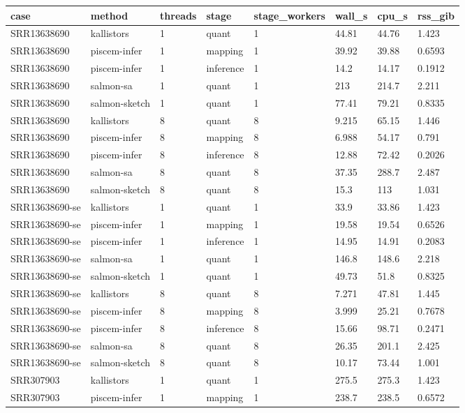 \begin{tabular}{llllllll}
\toprule
case & method & threads & stage & stage\_workers & wall\_s & cpu\_s & rss\_gib \\
\midrule
SRR13638690 & kallistors & 1 & quant & 1 & 44.81 & 44.76 & 1.423 \\
SRR13638690 & piscem-infer & 1 & mapping & 1 & 39.92 & 39.88 & 0.6593 \\
SRR13638690 & piscem-infer & 1 & inference & 1 & 14.2 & 14.17 & 0.1912 \\
SRR13638690 & salmon-sa & 1 & quant & 1 & 213 & 214.7 & 2.211 \\
SRR13638690 & salmon-sketch & 1 & quant & 1 & 77.41 & 79.21 & 0.8335 \\
SRR13638690 & kallistors & 8 & quant & 8 & 9.215 & 65.15 & 1.446 \\
SRR13638690 & piscem-infer & 8 & mapping & 8 & 6.988 & 54.17 & 0.791 \\
SRR13638690 & piscem-infer & 8 & inference & 8 & 12.88 & 72.42 & 0.2026 \\
SRR13638690 & salmon-sa & 8 & quant & 8 & 37.35 & 288.7 & 2.487 \\
SRR13638690 & salmon-sketch & 8 & quant & 8 & 15.3 & 113 & 1.031 \\
SRR13638690-se & kallistors & 1 & quant & 1 & 33.9 & 33.86 & 1.423 \\
SRR13638690-se & piscem-infer & 1 & mapping & 1 & 19.58 & 19.54 & 0.6526 \\
SRR13638690-se & piscem-infer & 1 & inference & 1 & 14.95 & 14.91 & 0.2083 \\
SRR13638690-se & salmon-sa & 1 & quant & 1 & 146.8 & 148.6 & 2.218 \\
SRR13638690-se & salmon-sketch & 1 & quant & 1 & 49.73 & 51.8 & 0.8325 \\
SRR13638690-se & kallistors & 8 & quant & 8 & 7.271 & 47.81 & 1.445 \\
SRR13638690-se & piscem-infer & 8 & mapping & 8 & 3.999 & 25.21 & 0.7678 \\
SRR13638690-se & piscem-infer & 8 & inference & 8 & 15.66 & 98.71 & 0.2471 \\
SRR13638690-se & salmon-sa & 8 & quant & 8 & 26.35 & 201.1 & 2.425 \\
SRR13638690-se & salmon-sketch & 8 & quant & 8 & 10.17 & 73.44 & 1.001 \\
SRR307903 & kallistors & 1 & quant & 1 & 275.5 & 275.3 & 1.423 \\
SRR307903 & piscem-infer & 1 & mapping & 1 & 238.7 & 238.5 & 0.6572 \\

\end{tabular}
